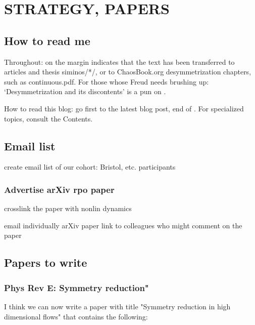 
\chapter{STRATEGY, PAPERS}

\section{How to read me}

Throughout:  {\textdollar} on the margin
{\steady}
indicates that the text has been transferred to
articles and thesis siminos/*/,  or to ChaosBook.org desymmetrization
chapters, such as
{continuous.pdf}.
%
For those whose Freud needs brushing up:
`Desymmetrization and its discontents' is a pun
on .

How to read this blog: go first to the latest blog post, end
of . For specialized topics, consult the
Contents.


\section{Email list}

create email list of our cohort:  Bristol, etc. participants

\subsection{Advertise arXiv rpo paper}

crosslink the paper with nonlin dynamics

email individually arXiv paper link to colleagues who might comment
    on the paper



\section{Papers to write}

\subsection{Phys Rev E: Symmetry reduction"}

\medskip{}
I think we can now write a paper with title "Symmetry
reduction in high dimensional flows" that contains the
following:

